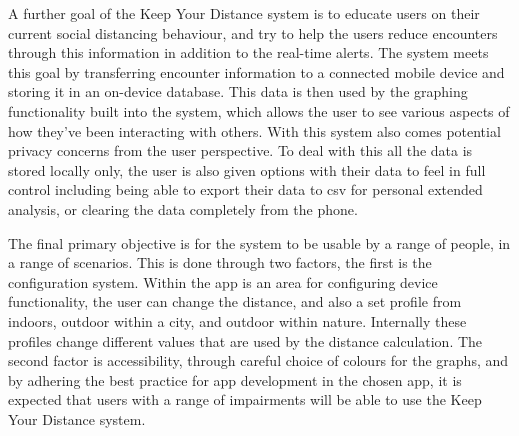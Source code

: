 \documentclass{l4proj}
\begin{document}
A further goal of the Keep Your Distance system is to educate users on their current social distancing behaviour, and try to help the users reduce encounters through this information in addition to the real-time alerts. The system meets this goal by transferring encounter information to a connected mobile device and storing it in an on-device database. This data is then used by the graphing functionality built into the system, which allows the user to see various aspects of how they've been interacting with others. With this system also comes potential privacy concerns from the user perspective. To deal with this all the data is stored locally only, the user is also given options with their data to feel in full control including being able to export their data to csv for personal extended analysis, or clearing the data completely from the phone.

The final primary objective is for the system to be usable by a range of people, in a range of scenarios. This is done through two factors, the first is the configuration system. Within the app is an area for configuring device functionality, the user can change the distance, and also a set profile from indoors, outdoor within a city, and outdoor within nature. Internally these profiles change different values that are used by the distance calculation. The second factor is accessibility, through careful choice of colours for the graphs, and by adhering the best practice for app development in the chosen app, it is expected that users with a range of impairments will be able to use the Keep Your Distance system.
\end{document}

